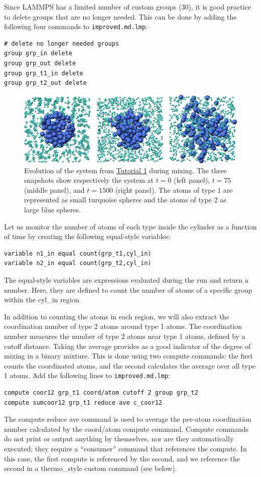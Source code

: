 \documentclass[9pt,tutorial]{livecoms}
\newcommand{\lmpcmd}[1]{\hspace{0pt}\colorbox{listing}{\textcolor{command}{\small{#1}}}\hspace{0pt}} %
\newcommand{\flecmd}[1]{\textcolor{command}{\texttt{#1}}} %
\begin{document}
Since LAMMPS has a limited number of custom groups (30), it is good practice
to delete groups that are no longer needed.  This can be done by adding the
following four commands to \flecmd{improved.md.lmp}:
\begin{lstlisting}
# delete no longer needed groups
group grp_in delete
group grp_out delete
group grp_t1_in delete
group grp_t2_out delete
\end{lstlisting}

\begin{figure}
\centering
\includegraphics[width=\linewidth]{LJ-evolution}
\caption{Evolution of the system from \hyperref[lennard-jones-label]{Tutorial 1}
during mixing.  The three snapshots show respectively the system
at $t=0$ (left panel), $t=75$ (middle panel), and $t=1500$ (right panel).  The
atoms of type 1 are represented as small turquoise spheres and the atoms of type 2
as large blue spheres.}
\label{fig:evolution-population}
\end{figure}

Let us monitor the number of atoms of each type inside the cylinder as a
function of time by creating the following equal-style variables:
\begin{lstlisting}
variable n1_in equal count(grp_t1,cyl_in)
variable n2_in equal count(grp_t2,cyl_in)
\end{lstlisting}
The equal-style \lmpcmd{variables} are expressions evaluated
during the run and return a number.  Here, they are defined to count
the number of atoms of a specific group within the \lmpcmd{cyl\_in} region.

In addition to counting the atoms in each region, we will also extract
the coordination number of type 2 atoms around type 1 atoms.  The
coordination number measures the number of type 2 atoms near
type 1 atoms, defined by a cutoff distance.  Taking the average provides
as a good indicator of the degree of mixing in a binary mixture.  This
is done using two \lmpcmd{compute} commands:  the first counts the
coordinated atoms, and the second calculates the average over all type 1
atoms.  Add the following lines to \flecmd{improved.md.lmp}:
\begin{lstlisting}
compute coor12 grp_t1 coord/atom cutoff 2 group grp_t2
compute sumcoor12 grp_t1 reduce ave c_coor12
\end{lstlisting}
The \lmpcmd{compute reduce ave} command is used to average the per-atom
coordination number calculated by the \lmpcmd{coord/atom}
compute command.  {\color{blue}Compute commands do not print or output
anything by themselves, nor are they automatically executed;} they
require a ``consumer'' command that references the compute.  In this case, the
first compute is referenced by the second, and we reference the second
in a \lmpcmd{thermo\_style custom} command (see below).
\end{document}
